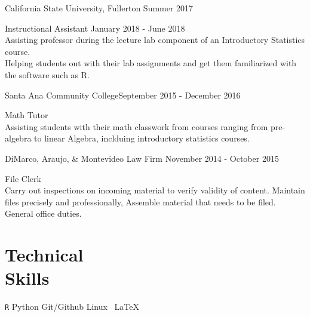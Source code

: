 \documentclass[margin,line]{res}
\newenvironment{list1}{
  \begin{list}{\ding{113}}{
      \setlength{\itemsep}{0in}
      \setlength{\parsep}{0in} \setlength{\parskip}{0in}
      \setlength{\topsep}{0in} \setlength{\partopsep}{0in} 
      \setlength{\leftmargin}{0.20in}}}{\end{list}}
\begin{document}
\begin{resume}
{\sc California State University, Fullerton} \hfill {Summer 2017}\\
\vspace*{-.15in}
\begin{list1}
\item[] {\sc Instructional Assistant} \hfill{January 2018 - June 2018} \\
\vskip -6pt
Assisting professor during the lecture lab component of an Introductory Statistics course. \\
Helping students out with their lab assignments and get them familiarized with the software such as R. 

\end{list1}
{\sc Santa Ana Community College}\hfill {September 2015 - December 2016 }\\
\vspace*{-.15in}
\begin{list1}
\item[] {\sc Math Tutor}  \\
\vskip -6pt
Assisting students with their math classwork from courses ranging from pre-algebra to linear Algebra, inclduing introductory statistics courses.
\end{list1}

{\sc DiMarco, Araujo, \& Montevideo Law Firm} \hfill {November 2014 - October 2015}\\
\vspace*{-.15in}
\begin{list1}
\item[]{\sc File Clerk}\\
\vskip -6pt
Carry out inspections on incoming material to verify validity of content. Maintain files precisely and professionally, Assemble material that needs to be filed. General office duties.
\end{list1}

\vspace{3ex}

\section{\sc Technical\\ Skills}
\verb|R|  \hspace{2ex} Python   \hspace{2ex} Git/Github \hspace{2ex}
Linux \hspace{2ex} \, \LaTeX 

\end{resume}
\end{document}
